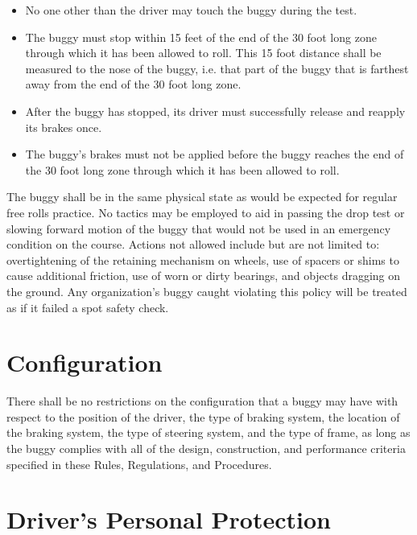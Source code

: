 	\begin{itemize}

		\item
		No one other than the driver may touch the buggy during the test.

		\item
		The buggy must stop within 15 feet of the end of the 30 foot long zone through
		which it has been allowed to roll. This 15 foot distance shall be measured to
		the nose of the buggy, i.e. that part of the buggy that is farthest away from
		the end of the 30 foot long zone.

		\item
		After the buggy has stopped, its driver must successfully release and reapply
		its brakes once.

		\item
		The buggy's brakes must not be applied before the buggy reaches the end of the
		30 foot long zone through which it has been allowed to roll.

	\end{itemize}

	The buggy shall be in the same physical state as would be expected for regular
	free rolls practice. No tactics may be employed to aid in passing the drop test
	or slowing forward motion of the buggy that would not be used in an emergency
	condition on the course. Actions not allowed include but are not limited to:
	overtightening of the retaining mechanism on wheels, use of spacers or shims to
	cause additional friction, use of worn or dirty bearings, and objects dragging
	on the ground. Any organization's buggy caught violating this policy will be
	treated as if it failed a spot safety check.


\section{Configuration}

	There shall be no restrictions on the configuration that a buggy may have with
	respect to the position of the driver, the type of braking system, the location
	of the braking system, the type of steering system, and the type of frame, as
	long as the buggy complies with all of the design, construction, and
	performance criteria specified in these Rules, Regulations, and Procedures.

\section{Driver's Personal Protection}


